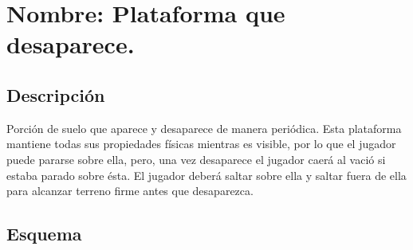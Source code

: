 \section{Nombre: Plataforma que desaparece.}\label{obs.PlatDes}
	\subsection{Descripción}
Porción de suelo que aparece y desaparece de manera periódica. Esta plataforma mantiene todas sus propiedades físicas mientras es visible, por lo que el jugador puede pararse sobre ella, pero, una vez desaparece el jugador caerá al vació si estaba parado sobre ésta. El jugador deberá saltar sobre ella y saltar fuera de ella para alcanzar terreno firme antes que desaparezca.  
	\subsection{Esquema}
